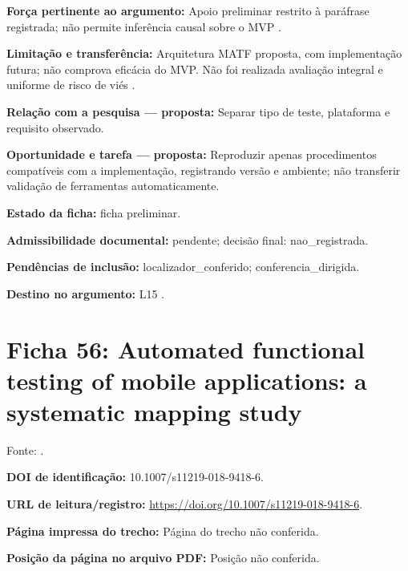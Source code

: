 \noindent\textbf{Força pertinente ao argumento:} Apoio preliminar restrito à paráfrase registrada; não permite inferência causal sobre o MVP \citep{eng02}.\par\medskip

\noindent\textbf{Limitação e transferência:} Arquitetura MATF proposta, com implementação futura; não comprova eficácia do MVP. Não foi realizada avaliação integral e uniforme de risco de viés \citep{eng02}.\par\medskip

\noindent\textbf{Relação com a pesquisa — proposta:} Separar tipo de teste, plataforma e requisito observado.\par\medskip

\noindent\textbf{Oportunidade e tarefa — proposta:} Reproduzir apenas procedimentos compatíveis com a implementação, registrando versão e ambiente; não transferir validação de ferramentas automaticamente.\par\medskip

\noindent\textbf{Estado da ficha:} ficha preliminar.\par\medskip

\noindent\textbf{Admissibilidade documental:} pendente; decisão final: nao\_registrada.\par\medskip

\noindent\textbf{Pendências de inclusão:} localizador\_conferido; conferencia\_dirigida.\par\medskip

\noindent\textbf{Destino no argumento:} L15 .

\clearpage\section*{Ficha 56: Automated functional testing of mobile applications: a systematic mapping study}

Fonte: \citet{eng03}.

\noindent\textbf{DOI de identificação:} 10.1007/s11219-018-9418-6.\par\medskip

\noindent\textbf{URL de leitura/registro:} \url{https://doi.org/10.1007/s11219-018-9418-6}.\par\medskip

\noindent\textbf{Página impressa do trecho:} Página do trecho não conferida.\par\medskip

\noindent\textbf{Posição da página no arquivo PDF:} Posição não conferida.\par\medskip

